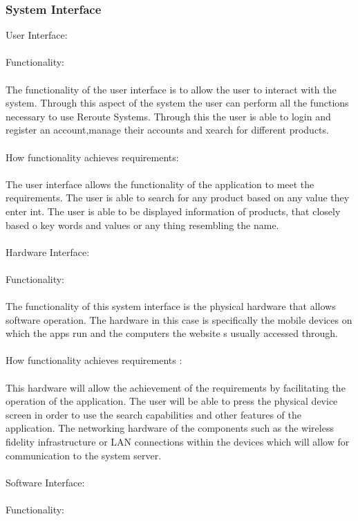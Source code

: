 \documentclass[a4paper,10pt]{article}
\begin{document}
        \subsubsection{System Interface}{
User Interface:
\\\\
Functionality:
\\\\
The functionality of the user interface is to allow the user to interact with the system. Through this aspect of the system the user can perform all the functions necessary to use Reroute Systems. Through this the user is able to login and register an account,manage their accounts and xearch for different products.
\\\\
How functionality achieves requirements:
\\\\
The user interface allows the functionality of the application to meet the requirements. The user is able to search for any product based on any value they enter int. The user is able to be displayed information of products, that closely based o key words and values or any thing resembling the name. 
\\\\
Hardware Interface:
\\\\
Functionality:
\\\\
The functionality of this system interface is the physical hardware that allows software operation. The hardware in this case is specifically the mobile devices on which the apps run and the computers the website s usually accessed through.
\\\\
How functionality achieves requirements :
\\\\
This hardware will allow the achievement of the requirements by facilitating the operation of the application. The user will be able to press the physical device screen in order to use the search capabilities and other features of the application. The networking hardware of the components such as the wireless fidelity infrastructure or LAN connections within the devices which will allow for communication to the system server.
\\\\
Software Interface:
\\\\
Functionality:
}
\end{document}

